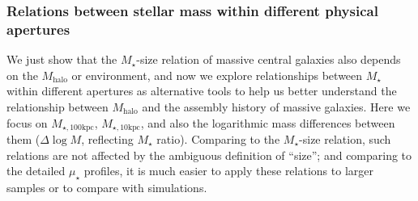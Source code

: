 \documentclass{emulateapj}
\def\rbcg{\texttt{cenHighMh}}
\def\nbcg{\texttt{cenLowMh}}
\def\mstar{{$M_{\star}$}}
\def\mhalo{{$M_{\mathrm{halo}}$}}
\def\logms{{$\log (M_{\star}/M_{\odot})$}}
\def\minn{{$M_{\star,10\mathrm{kpc}}$}}
\def\mtot{{$M_{\star,100\mathrm{kpc}}$}}
\def\mden{{$\mu_{\star}$}}
\begin{document}
\begin{CJK*}{UTF8}{gbsn}


\subsubsection{Relations between stellar mass within different physical apertures}
    \label{sssec:m100_m10}
    
    We just show that the \mstar{}-size relation of massive central galaxies also 
    depends on the \mhalo{} or environment, and now we explore relationships between 
    \mstar{} within different apertures as alternative tools to help
    us better understand the relationship between \mhalo{} and the assembly history of 
    massive galaxies.  
    Here we focus on \mtot{}, \minn{}, and also the logarithmic mass differences 
    between them ($\Delta \log M$, reflecting \mstar{} ratio). 
    Comparing to the \mstar{}-size relation, such relations are not affected by the 
    ambiguous definition of ``size''; and comparing to the detailed \mden{} profiles, 
    it is much easier to apply these relations to larger samples or to compare with 
    simulations.
   

\end{CJK*}
\end{document}

